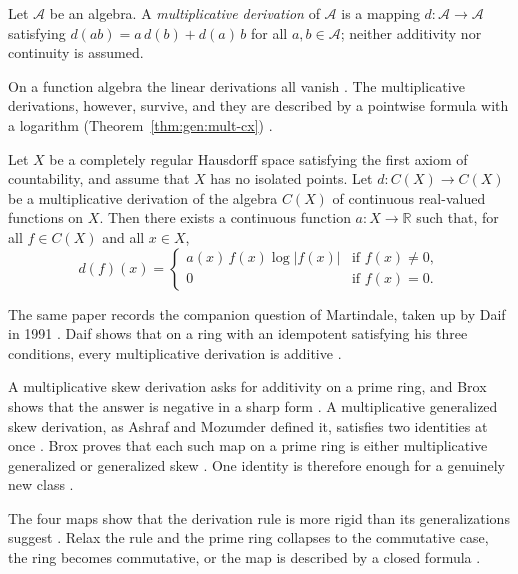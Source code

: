 \begin{definition}\label{def:gen:multiplicative-derivation}
Let $\mathcal{A}$ be an algebra. A \emph{multiplicative derivation} of
$\mathcal{A}$ is a mapping $d\colon\mathcal{A}\to\mathcal{A}$ satisfying
$d(ab)=a\,d(b)+d(a)\,b$ for all $a,b\in\mathcal{A}$; neither additivity nor
continuity is assumed.
\end{definition}

On a function algebra the linear derivations all vanish
\cite[p.~190]{GoldmannSemrl1996}. The multiplicative derivations, however,
survive, and they are described by a pointwise formula with a logarithm (Theorem~\ref{thm:gen:mult-cx})
\cite[p.~191]{GoldmannSemrl1996}.\begin{theorem}\label{thm:gen:mult-cx}
Let $X$ be a completely regular Hausdorff space satisfying the first axiom of
countability, and assume that $X$ has no isolated points. Let
$d\colon C(X)\to C(X)$ be a multiplicative derivation of the algebra $C(X)$
of continuous real-valued functions on $X$. Then there exists a continuous
function $a\colon X\to\mathbb{R}$ such that, for all $f\in C(X)$ and all
$x\in X$,
\begin{equation*}
d(f)(x)=
\begin{cases}
a(x)\,f(x)\log|f(x)| & \text{if }f(x)\neq 0,\\
0 & \text{if }f(x)=0.
\end{cases}
\end{equation*}
\end{theorem}

The same paper records the companion question of Martindale, taken up by Daif
in 1991 \cite[p.~615]{Daif1991}. Daif shows that on a ring with an idempotent
satisfying his three conditions, every multiplicative derivation is additive
\cite[p.~615]{Daif1991}.

A multiplicative skew derivation asks for additivity on a prime ring, and Brox
shows that the answer is negative in a sharp form
\cite[p.~3]{Brox2020TwoSided}. A multiplicative generalized skew derivation,
as Ashraf and Mozumder defined it, satisfies two identities at once
\cite[p.~2]{Brox2020TwoSided}. Brox proves that each such map on a prime ring
is either multiplicative generalized or generalized skew \cite[Theorem~2.2,
pp.~3--4]{Brox2020TwoSided}. One identity is therefore enough for a genuinely
new class \cite[p.~1]{Brox2020TwoSided}.

The four maps show that the derivation rule is more rigid than its
generalizations suggest \cite[p.~867]{Chuang1990Semi}. Relax the rule and the
prime ring collapses to the commutative case, the ring becomes commutative, or
the map is described by a closed formula
\cite[pp.~1106, 191]{Herstein1957}.

